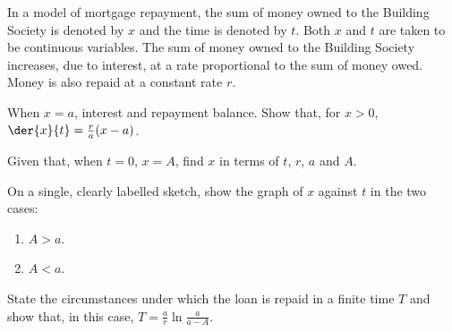 \begin{problem}
    In a model of mortgage repayment, the sum of money owned to the Building Society is denoted by $x$ and the time is denoted by $t$. Both $x$ and $t$ are taken to be continuous variables. The sum of money owned to the Building Society increases, due to interest, at a rate proportional to the sum of money owed. Money is also repaid at a constant rate $r$.

    When $x = a$, interest and repayment balance. Show that, for $x > 0$, $\der{x}{t} = \frac{r}{a} (x - a)$.

    Given that, when $t = 0$, $x = A$, find $x$ in terms of $t$, $r$, $a$ and $A$.

    On a single, clearly labelled sketch, show the graph of $x$ against $t$ in the two cases:
    \begin{enumerate}
        \item $A > a$.
        \item $A < a$.
    \end{enumerate}

    State the circumstances under which the loan is repaid in a finite time $T$ and show that, in this case, $T = \frac{a}{r} \ln \frac{a}{a - A}$.
\end{problem}
